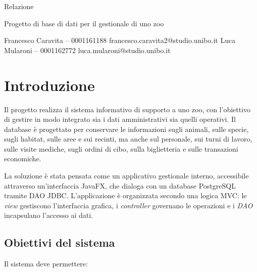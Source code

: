 \documentclass[12pt,a4paper]{report}
\begin{document}
\begin{titlepage}
\centering
\vspace*{2cm}
{\Large Relazione\par}

\vspace{0.4cm}
\vspace{1.5cm}
{\large Progetto di base di dati per il gestionale di uno zoo\par}
\vspace{1.5cm}
\hfill
\begin{minipage}{0.4\textwidth}
    \small
    Francesco Caravita – 0001161188 \newline
    francesco.caravita2@studio.unibo.it 
    \newline
    Luca Mularoni – 0001162772 \newline
    luca.mularoni@studio.unibo.it
\end{minipage}
\vfill

\end{titlepage}

\tableofcontents
\clearpage

\iffalse %
\chapter{Introduzione}

Il progetto realizza il sistema informativo di supporto a uno zoo, con l'obiettivo di
gestire in modo integrato sia i dati amministrativi sia quelli operativi.
Il database è progettato per conservare le informazioni sugli animali, sulle specie,
sugli habitat, sulle aree e sui recinti, ma anche sul personale, sui turni di lavoro,
sulle visite mediche, sugli ordini di cibo, sulla biglietteria e sulle transazioni
economiche.

La soluzione è stata pensata come un applicativo gestionale interno, accessibile
attraverso un'interfaccia JavaFX, che dialoga con un database PostgreSQL tramite
DAO JDBC. L'applicazione è organizzata secondo una logica MVC: le \emph{view}
gestiscono l'interfaccia grafica, i \emph{controller} governano le operazioni e i
\emph{DAO} incapsulano l'accesso ai dati.

\section{Obiettivi del sistema}

Il sistema deve permettere:
\end{document}
